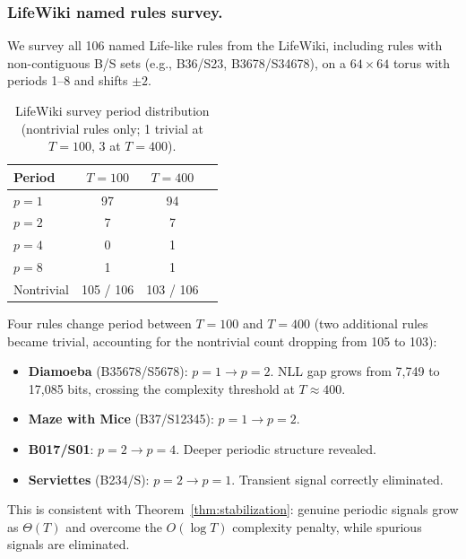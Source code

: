 \documentclass[letterpaper]{article}
\theoremstyle{definition}
\theoremstyle{remark}
\begin{document}
\subsubsection{LifeWiki named rules survey.}
We survey all 106 named Life-like rules from the LifeWiki, including rules with non-contiguous B/S sets (e.g., B36/S23, B3678/S34678), on a $64 \times 64$ torus with periods 1--8 and shifts $\pm 2$.

\begin{table}[!htb]
\centering
\caption{LifeWiki survey period distribution (nontrivial rules only; 1 trivial at $T{=}100$, 3 at $T{=}400$).}\label{tab:lifewiki}
\begin{tabular}{lccc}
\toprule
Period & $T{=}100$ & $T{=}400$ \\
\midrule
$p=1$ & 97 & 94 \\
$p=2$ & 7 & 7 \\
$p=4$ & 0 & 1 \\
$p=8$ & 1 & 1 \\
\midrule
Nontrivial & 105 / 106 & 103 / 106 \\
\bottomrule
\end{tabular}
\end{table}

Four rules change period between $T{=}100$ and $T{=}400$ (two additional rules became trivial, accounting for the nontrivial count dropping from 105 to 103):
\begin{itemize}
    \item \textbf{Diamoeba} (B35678/S5678): $p{=}1 \to p{=}2$. NLL gap grows from 7{,}749 to 17{,}085 bits, crossing the complexity threshold at $T{\approx}400$.
    \item \textbf{Maze with Mice} (B37/S12345): $p{=}1 \to p{=}2$.
    \item \textbf{B017/S01}: $p{=}2 \to p{=}4$. Deeper periodic structure revealed.
    \item \textbf{Serviettes} (B234/S): $p{=}2 \to p{=}1$. Transient signal correctly eliminated.
\end{itemize}

This is consistent with Theorem~\ref{thm:stabilization}: genuine periodic signals grow as $\Theta(T)$ and overcome the $O(\log T)$ complexity penalty, while spurious signals are eliminated.
\end{document}
